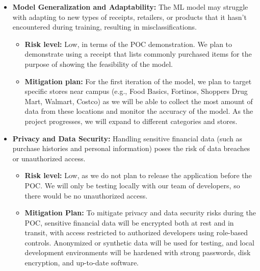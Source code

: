 \documentclass{article}
\begin{document}
\begin{itemize}
    \item \textbf{Model Generalization and Adaptability:} The ML model may
    struggle with adapting to new types of receipts, retailers, or products that
    it hasn't encountered during training, resulting in misclassifications.
    \begin{itemize}
        \item \textbf{Risk level:} Low, in terms of the POC demonstration. We
        plan to demonstrate using a receipt that lists commonly purchased items
        for the purpose of showing the feasibility of the model.
        \item \textbf{Mitigation plan:} For the first iteration of the model, we
        plan to target specific stores near campus (e.g., Food Basics, Fortinos,
        Shoppers Drug Mart, Walmart, Costco) as we will be able to collect the
        most amount of data from these locations and monitor the accuracy of the
        model. As the project progresses, we will expand to different categories
        and stores.
    \end{itemize}

    \item \textbf{Privacy and Data Security:} Handling sensitive financial data
    (such as purchase histories and personal information) poses the risk of data
    breaches or unauthorized access.
    \begin{itemize}
        \item \textbf{Risk level:} Low, as we do not plan to release the
        application before the POC. We will only be testing locally with our
        team of developers, so there would be no unauthorized access.
         \item \textbf{Mitigation Plan:} To mitigate privacy and data security
         risks during the POC, sensitive financial data will be encrypted both
         at rest and in transit, with access restricted to authorized developers
         using role-based controls. Anonymized or synthetic data will be used
         for testing, and local development environments will be hardened with
         strong passwords, disk encryption, and up-to-date software. 
    \end{itemize}


\end{itemize}
\end{document}
